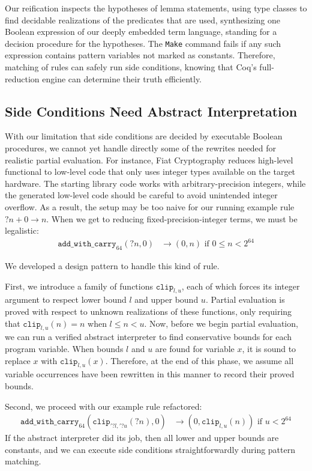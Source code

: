 Our reification inspects the hypotheses of lemma statements, using type classes to find decidable realizations of the predicates that are used, synthesizing one Boolean expression of our deeply embedded term language, standing for a decision procedure for the hypotheses.
The \texttt{Make} command fails if any such expression contains pattern variables not marked as constants.
Therefore, matching of rules can safely run side conditions, knowing that Coq's full-reduction engine can determine their truth efficiently.

\subsection{Side Conditions Need Abstract Interpretation} \label{sec:abs-int}

With our limitation that side conditions are decided by executable Boolean procedures, we cannot yet handle directly some of the rewrites needed for realistic partial evaluation.
For instance, Fiat Cryptography reduces high-level functional to low-level code that only uses integer types available on the target hardware.
The starting library code works with arbitrary-precision integers, while the generated low-level code should be careful to avoid unintended integer overflow.
As a result, the setup may be too naive for our running example rule ${?n} + 0 \to n$.
When we get to reducing fixed-precision-integer terms, we must be legalistic:
\begin{align*}
  \texttt{add\_with\_carry}_{64}({?n}, 0) & \to (0, n)\text{\ \ if\ \ }0 \le n < 2^{64}
\end{align*}

We developed a design pattern to handle this kind of rule.

First, we introduce a family of functions $\texttt{clip}_{l,u}$, each of which forces its integer argument to respect lower bound $l$ and upper bound $u$.
Partial evaluation is proved with respect to unknown realizations of these functions, only requiring that $\texttt{clip}_{l, u}(n) = n$ when $l \leq n < u$.
Now, before we begin partial evaluation, we can run a verified abstract interpreter to find conservative bounds for each program variable.
When bounds $l$ and $u$ are found for variable $x$, it is sound to replace $x$ with $\texttt{clip}_{l,u}(x)$.
Therefore, at the end of this phase, we assume all variable occurrences have been rewritten in this manner to record their proved bounds.

Second, we proceed with our example rule refactored:
\begin{align*}
  \texttt{add\_with\_carry}_{64}(\texttt{clip}_{'{?l},'{?u}}({?n}), 0) & \to (0, \texttt{clip}_{l,u}(n)) %
  \text{\ \ if\ \ }u < 2^{64}
\end{align*}
If the abstract interpreter did its job, then all lower and upper bounds are constants, and we can execute side conditions straightforwardly during pattern matching.

